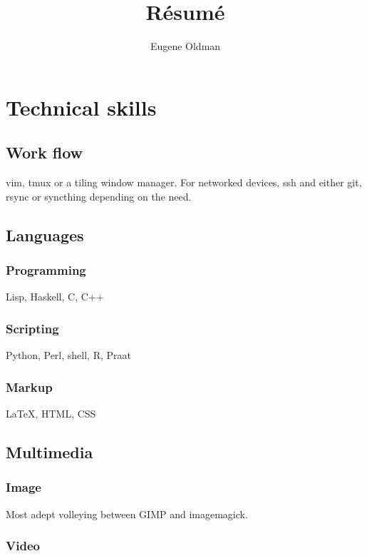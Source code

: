\documentclass{article}
\begin{document}
\title{R\'esum\'e}
\author{Eugene Oldman}

\maketitle

\section{Technical skills}

\subsection{Work flow}

vim, tmux or a tiling window manager. For networked devices, ssh and either git, rsync or syncthing depending on the need.

\subsection{Languages}

\subsubsection{Programming}

Lisp, Haskell, C, C++

\subsubsection{Scripting}

Python, Perl, shell, R, Praat

\subsubsection{Markup}

{\LaTeX}, HTML, CSS

\subsection{Multimedia}

\subsubsection{Image}

Most adept volleying between GIMP and imagemagick.

\subsubsection{Video}
\end{document}
